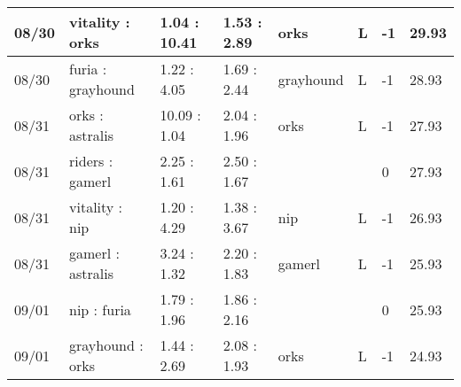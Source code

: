 \begin{small}
\begin{longtable}{|l|l|l|l|l|l|l|l|}
	08/30                               & vitality : orks                     & 1.04 : 10.41                            & 1.53 : 2.89                             & orks                              & L                                 & -1                                   & 29.93                             \\ \hline
	08/30                               & furia : grayhound                   & 1.22 : 4.05                             & 1.69 : 2.44                             & grayhound                         & L                                 & -1                                   & 28.93                             \\ \hline
	08/31                               & orks : astralis                     & 10.09 : 1.04                            & 2.04 : 1.96                             & orks                              & L                                 & -1                                   & 27.93                             \\ \hline
	08/31                               & riders : gamerl                     & 2.25 : 1.61                             & 2.50 : 1.67                             &                                   &                                   & 0                                    & 27.93                             \\ \hline
	08/31                               & vitality : nip                      & 1.20 : 4.29                             & 1.38 : 3.67                             & nip                               & L                                 & -1                                   & 26.93                             \\ \hline
	08/31                               & gamerl : astralis                   & 3.24 : 1.32                             & 2.20 : 1.83                             & gamerl                            & L                                 & -1                                   & 25.93                             \\ \hline
	09/01                               & nip : furia                         & 1.79 : 1.96                             & 1.86 : 2.16                             &                                   &                                   & 0                                    & 25.93                             \\ \hline
	09/01                               & grayhound : orks                    & 1.44 : 2.69                             & 2.08 : 1.93                             & orks                              & L                                 & -1                                   & 24.93                             \\ \hline

\end{longtable}
\end{small}

